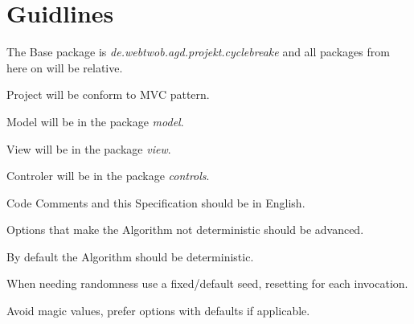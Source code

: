 \section{Guidlines}

\begin{list}{-}{}
\item The Base package is \textit{de.webtwob.agd.projekt.cyclebreake} and all packages from here on will be relative.
\item Project will be conform to MVC pattern.
\item Model will be in the package \textit{model}.
\item View will be in the package \textit{view}.
\item Controler will be in the package \textit{controls}.
\item Code Comments and this Specification should be in English.
\item Options that make the Algorithm not deterministic should be advanced.
\item By default the Algorithm should be deterministic.
\item When needing randomness use a fixed/default seed, resetting for each invocation.
\item Avoid magic values, prefer options with defaults if applicable.
\end{list}
